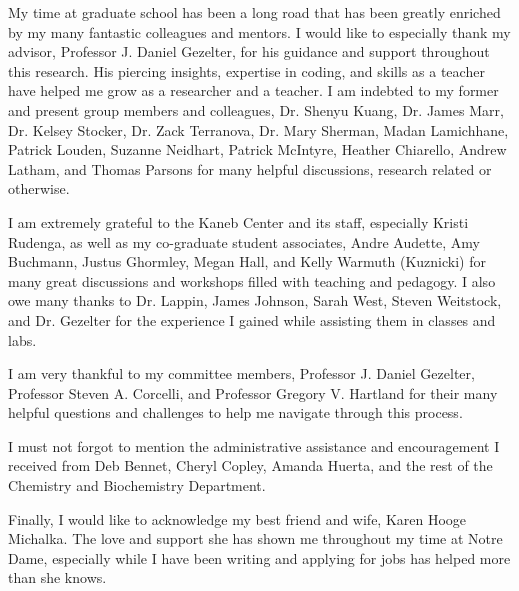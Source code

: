 \begin{acknowledge} 
My time at graduate school has been a long road that has been greatly enriched
by my many fantastic colleagues and mentors. I would like to especially thank
my advisor, Professor J. Daniel Gezelter, for his guidance and support
throughout this research. His piercing insights, expertise in coding, and
skills as a teacher have helped me grow as a researcher and a teacher. I am
indebted to my former and present group members and colleagues, Dr. Shenyu
Kuang, Dr. James Marr, Dr.  Kelsey Stocker, Dr. Zack Terranova, Dr. Mary
Sherman, Madan Lamichhane, Patrick Louden, Suzanne Neidhart, Patrick McIntyre,
Heather Chiarello, Andrew Latham, and Thomas Parsons for many helpful
discussions, research related or otherwise.

I am extremely grateful to the Kaneb Center and its staff, especially Kristi
Rudenga, as well as my co-graduate student associates, Andre Audette, Amy
Buchmann, Justus Ghormley, Megan Hall, and Kelly Warmuth (Kuznicki) for many
great discussions and workshops filled with teaching and pedagogy. I also owe
many thanks to Dr. Lappin, James Johnson, Sarah West, Steven Weitstock, and Dr.
Gezelter for the experience I gained while assisting them in classes and labs.

I am very thankful to my committee members, Professor J. Daniel Gezelter,
Professor Steven A. Corcelli, and Professor Gregory V. Hartland for their many
helpful questions and challenges to help me navigate through this process. 

I must not forgot to mention the administrative assistance and encouragement I
received from Deb Bennet, Cheryl Copley, Amanda Huerta, and the rest of the
Chemistry and Biochemistry Department.

Finally, I would like to acknowledge my best friend and wife, Karen Hooge
Michalka. The love and support she has shown me throughout my time at Notre
Dame, especially while I have been writing and applying for jobs has helped
more than she knows.
\end{acknowledge}

